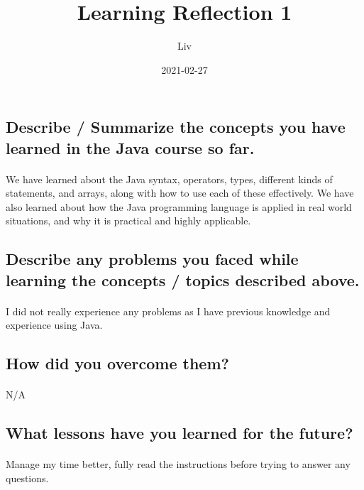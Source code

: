 \documentclass{article}
\title{Learning Reflection 1}
\date{2021-02-27}
\author{Liv}
\begin{document}
    \maketitle

    \subsection*{Describe / Summarize the concepts you have learned in the Java course so far.}
    \paragraph{}
    We have learned about the Java syntax, operators, types, different kinds of statements, and arrays, along with how to use each of these effectively.
    We have also learned about how the Java programming language is applied in real world situations, and why it is practical and highly applicable.
    
    \subsection*{Describe any problems you faced while learning the concepts / topics described above.}
    \paragraph{}
    I did not really experience any problems as I have previous knowledge and experience using Java.

    \subsection*{How did you overcome them?}
    \paragraph{}
    N/A

    \subsection*{What lessons have you learned for the future?}
    \paragraph{}
    Manage my time better, fully read the instructions before trying to answer any questions.
\end{document}
